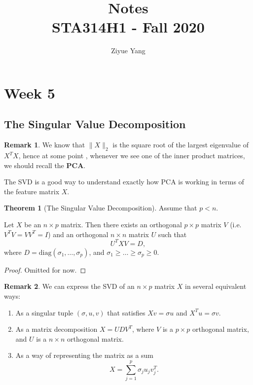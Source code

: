 \documentclass[11pt]{article}
\title{Notes\\
  {\large STA314H1 - Fall 2020}}
\author{Ziyue Yang}
\theoremstyle{definition}
\newtheorem{theorem}{Theorem}[section]
\newtheorem{remark}{Remark}[section]
\numberwithin{equation}{section}
\begin{document}
\maketitle

\tableofcontents

\newpage

\section{Week 5}
\subsection{The Singular Value Decomposition}

\begin{remark}
 We know that $\| X \|_2$ is the square root of the largest eigenvalue of $X^T X$, hence at some point , whenever we see one of the inner product matrices, we should recall the \textbf{PCA}.

 The SVD is a good way to understand exactly how PCA is working in terms of the feature matrix $X$.
\end{remark}

\begin{theorem}[The Singular Value Decomposition]
  Assume that $p < n$.

  Let $X$ be an $n\times p$ matrix. Then there exists an orthogonal $p\times p$ matrix $V$ (i.e. $V^T V = VV^T = I$) and an orthogonal $n\times n$ matrix $U$ such that
  \begin{equation}
    U^TXV=D,
  \end{equation}
where $D=\text{diag}(\sigma_1,\dots,\sigma_p)$, and $\sigma_1\geq \dots\geq \sigma_p\geq 0$.
\end{theorem}

\begin{proof}
  Omitted for now.
\end{proof}

\begin{remark}
  We can express the SVD of an $n\times p$ matrix $X$ in several equivalent ways:
  \begin{enumerate}
    \item As a singular tuple $(\sigma,u,v)$ that satisfies $Xv=\sigma u$ and $X^Tu=\sigma v$.
    \item As a matrix decomposition $X=UDV^T$, where $V$ is a $p\times p$ orthogonal matrix, and $U$ is a $n\times n$ orthogonal matrix.
    \item As a way of representing the matrix as a sum
    \begin{equation}
      X=\sum^p_{j=1}\sigma_j u_j v_j^T.
    \end{equation}
  \end{enumerate}
\end{remark}
\end{document}

